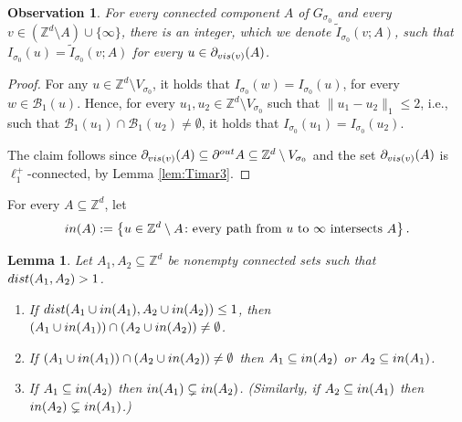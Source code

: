 \documentclass[11pt, reqno]{amsart}
\newtheorem{lemma}[theorem]{Lemma}
\newtheorem{obs}[theorem]{Observation}
\numberwithin{equation}{section}
\begin{document}
\begin{obs}\label{obs:svC}
For every connected component $A$ of $G_{\sigma_0}$ and every $v\in({\mathbb Z}^d\setminus A)\cup\{\infty\}$, there is an integer, which we denote $\tilde{I}_{\sigma_0}(v;A)$, such that $I_{\sigma_0}(u)=\tilde{I}_{\sigma_0}(v;A)$ for every $u\in\partial_{{\rm vis}(v)}(A)$.
\end{obs}

\begin{proof}
For any $u\in{\mathbb Z}^d\setminus V_{\sigma_0}$, it holds that $I_{\sigma_0}(w)=I_{\sigma_0}(u)$, for every $w\in{\mathcal B}_1(u)$.
Hence, for every $u_1,u_2 \in{\mathbb Z}^d\setminus V_{\sigma_0}$ such that $\lVert u_1-u_2\rVert_1\leq 2$, i.e., such that ${\mathcal B}_1(u_1)\cap {\mathcal B}_1(u_2)\neq\emptyset$, it holds that $I_{\sigma_0}(u_1)=I_{\sigma_0}(u_2)$.

The claim follows since $\partial_{{\rm vis}(v)}(A)\subseteq\partial^{\rm out}A\subseteq{\mathbb Z}^d\setminus V_{\sigma_0}$ and the set $\partial_{{\rm vis}(v)}(A)$ is $\ell_1^+$-connected, by Lemma \ref{lem:Timar3}. 
\end{proof}

For every $A\subseteq{\mathbb Z}^d$, let
$$
{\rm in}(A):=\left\{ u\in {\mathbb Z}^d\setminus A\colon  \text{every path from } u \text{ to }\infty \text{ intersects }A\right\}.
$$

\begin{lemma}\label{lem:unique smallest contour} 
Let $A_1, A_2\subseteq {\mathbb Z}^d$ be nonempty connected sets such that ${\rm dist}(A_1,A_2)>1$.
\begin{enumerate}
\item 
If ${\rm dist}(A_1\cup{\rm in}(A_1), A_2\cup{\rm in}(A_2))\leq 1$, then $(A_1\cup{\rm in}(A_1))\cap(A_2\cup{\rm in}(A_2))\neq\emptyset$.
\item
If $(A_1\cup{\rm in}(A_1))\cap(A_2\cup{\rm in}(A_2))\neq\emptyset$ then $A_1\subseteq{\rm in}(A_2)$ or $A_2\subseteq{\rm in}(A_1)$. 
\item
If $A_1\subseteq{\rm in}(A_2)$ then ${\rm in}(A_1)\subsetneq{\rm in}(A_2)$. (Similarly, if $A_2\subseteq{\rm in}(A_1)$ then ${\rm in}(A_2)\subsetneq{\rm in}(A_1)$.)
\end{enumerate}
\end{lemma}
\end{document}
